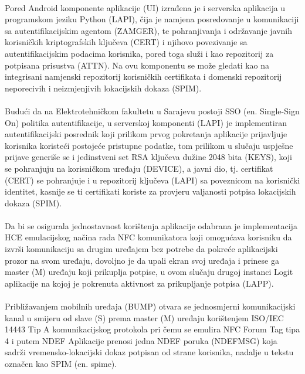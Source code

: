 \paragraph*{}
Pored Android komponente aplikacije (UI) izrađena je i serverska aplikacija u programskom jeziku Python (LAPI), čija je namjena posredovanje u komunikaciji sa autentifikacijskim agentom (ZAMGER), te pohranjivanja i održavanje javnih korisničkih kriptografskih ključeva (CERT) i njihovo povezivanje sa autentifikacijskim podacima korisnika, pored toga služi i kao repozitorij za potpisana prisustva (ATTN). Na ovu komponentu se može gledati kao na integrisani namjenski repozitorij korisničkih certifikata i domenski repozitorij neporecivih i neizmjenjivih lokacijskih dokaza (SPIM).

\paragraph*{}
Budući da na Elektrotehničkom fakultetu u Sarajevu postoji SSO (en. Single-Sign On) politika autentifikacije, u serverskoj komponenti (LAPI) je implementiran autentifikacijski posrednik koji prilikom prvog pokretanja aplikacije prijavljuje korisnika koristeći postojeće pristupne podatke, tom prilikom u slučaju uspješne prijave generiše se i jedinstveni set RSA ključeva dužine 2048 bita (KEYS), koji se pohranjuju na korisničkom uređaju (DEVICE), a javni dio, tj. certifikat (CERT) se pohranjuje i u repozitorij ključeva (LAPI) sa poveznicom na korisnički identitet, kasnije se ti certifikati koriste za provjeru valjanosti potpisa lokacijskih dokaza (SPIM).

\paragraph*{}
Da bi se osigurala jednostavnost korištenja aplikacije odabrana je implementacija HCE emulacijskog načina rada NFC komunikatora koji omogućava korisniku da izvrši komunikaciju sa drugim uređajem bez potrebe da pokreće aplikacijski prozor na svom uređaju, dovoljno je da upali ekran svoj uređaja i prinese ga master (M) uređaju koji prikuplja potpise, u ovom slučaju drugoj instanci Logit aplikacije na kojoj je pokrenuta aktivnost za prikupljanje potpisa (LAPP).

\paragraph*{}
Približavanjem mobilnih uređaja (BUMP) otvara se jednosmjerni komunikacijski kanal u smijeru od slave (S) prema master (M) uređaju korištenjem ISO/IEC 14443 Tip A komunikacijskog protokola pri čemu se emulira NFC Forum Tag tipa 4 i putem NDEF Aplikacije prenosi jedna NDEF poruka (NDEFMSG) koja sadrži vremensko-lokacijski dokaz potpisan od strane korisnika, nadalje u tekstu označen kao SPIM (en. spime)\cite{bruces}.

